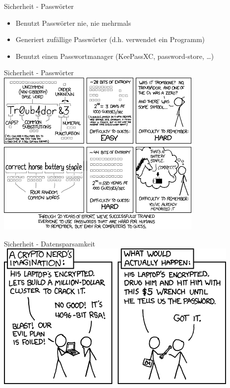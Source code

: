 \documentclass{beamer}
\begin{document}
\begin{frame}{Sicherheit - Passwörter}
	\begin{itemize}
		\item Benutzt Passwörter nie, nie mehrmals
                \item Generiert zufällige Passwörter (d.h. verwendet ein Programm)
		\item Benutzt einen Passwortmanager (KeePassXC, password-store, \dots)
	\end{itemize}
\end{frame}

\begin{frame}{Sicherheit - Passwörter}
	\includegraphics[width=10cm]{password_strength.png}
\end{frame}

\begin{frame}{Sicherheit - Datensparsamkeit}
    \centering\includegraphics[height=0.7\textheight]{opsec_xkcd.png}	
\end{frame}
\end{document}

